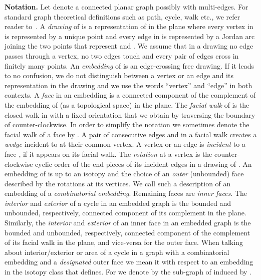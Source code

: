 \documentclass{llncs}
\begin{document}
 {\bf Notation.}
Let  denote a connected planar graph possibly with multi-edges.
For  standard graph theoretical definitions such as path, cycle, walk etc.,
we refer reader to~\cite[Section 1]{D05}. 
A \emph{drawing} of  is a representation of  in the plane where every vertex
 in  is represented by a unique point and every
edge  in  is represented by a Jordan arc joining the two points that represent  and . 
We assume that in a drawing no edge passes through a vertex,
no two edges touch and every pair of edges cross in finitely many points.
An \emph{embedding} of  is an  edge-crossing free drawing.
If it leads to no confusion, we do not distinguish between
a vertex or an edge and its representation in the drawing and we use the words ``vertex'' and ``edge'' in both
 contexts.
A  \emph{face} in an embedding is a connected component of the complement of the embedding 
of  (as a topological space) in the plane.
 The \emph{facial walk} of  is the closed walk in  with a fixed orientation that we obtain by traversing the boundary of  counter-clockwise.
In order to simplify the notation we sometimes denote the facial walk of a face  by . 
  A pair of consecutive edges  and  in a facial walk  creates a \emph{wedge} incident to  at their common vertex.
  A vertex or an edge is \emph{incident} to a face , if it appears on its facial walk.
The \emph{rotation} at a vertex is the counter-clockwise cyclic order of the end pieces of its incident edges
in a drawing of .
An embedding of  is up to an isotopy and the choice of an \emph{outer} (unbounded) face described by the rotations at its vertices. We call such a description of an embedding of  a \emph{combinatorial embedding}. Remaining faces are \emph{inner faces}.
The \emph{interior} and \emph{exterior} of a cycle in an embedded graph is the bounded and unbounded, respectively, connected component
of its complement in the plane. 
Similarly, the \emph{interior} and \emph{exterior} of an inner face in an embedded graph is the bounded and unbounded, respectively, connected component
of the complement of its facial walk in the plane, and vice-versa for the outer face.
When talking  about interior/exterior or area of a cycle  
in a graph  with a combinatorial embedding and a \emph{designated} outer face  we mean it with respect to an embedding in the isotopy class that  defines.
For  we denote by  the sub-graph of  induced by . 
\end{document}
